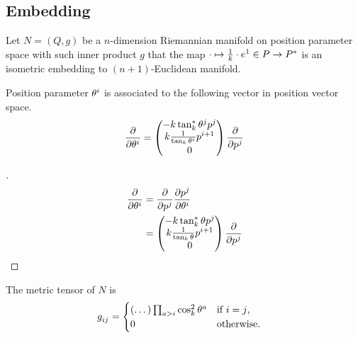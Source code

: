 \documentclass[stu, babel, american, biblatex, a4paper, leqno, draftall]{apa7}
\begin{document}
\subsection{Embedding}
\begin{definition}\label{M:Embedding}
    Let $N=\left(Q,g\right)$ be a $n$-dimension Riemannian manifold
    on position parameter space with such inner product $g$ that
    the map $\cdot\mapsto\frac{1}{k}\cdot\tensor{e}{^1}\in P\to P^\ast$ is an isometric embedding to $\left(n+1\right)$-Euclidean manifold.
\end{definition}
\begin{lemma}\label{M:Tangent:Basis}
    Position parameter $\tensor{\theta}{^i}$ is associated to the following vector in position vector space.
    \begin{equation*}
        \frac{\partial}{\partial\tensor{\theta}{^i}} =
        \begin{pmatrix}
            -k\tan_k^\ast\tensor{\theta}{^j}\tensor{p}{^j} \\
            k\frac{1}{\tan_k\tensor{\theta}{^i}}\tensor{p}{^{i+1}} \\
            0
        \end{pmatrix} \frac{\partial}{\partial\tensor{p}{^j}}
    \end{equation*}
\end{lemma}
\begin{proof}[]
    \begin{align*}
        \frac{\partial}{\partial\tensor{\theta}{^i}}
        &= \frac{\partial}{\partial\tensor{p}{^j}}\frac{\partial\tensor{p}{^j}}{\partial\tensor{\theta}{^i}} \\
        &= \begin{pmatrix}
            -k\tan_k^\ast\theta\tensor{p}{^j} \\
            k\frac{1}{\tan_k\theta}\tensor{p}{^{i+1}} \\
            0
        \end{pmatrix}\frac{\partial}{\partial\tensor{p}{^j}}
    \end{align*}
\end{proof}
\begin{lemma}\label{M:MetricTensor}
    The metric tensor of $N$ is
    \begin{align*}
        \tensor{g}{_i_j} & =
        \begin{cases}
            \left(\dots\right)\prod_{a>i}{\cos_k^2{\tensor{\theta}{^a}}} & \text{if $i=j$,}  \\
            0                                                            & \text{otherwise.} \\
        \end{cases}
    \end{align*}
\end{lemma}
\end{document}
